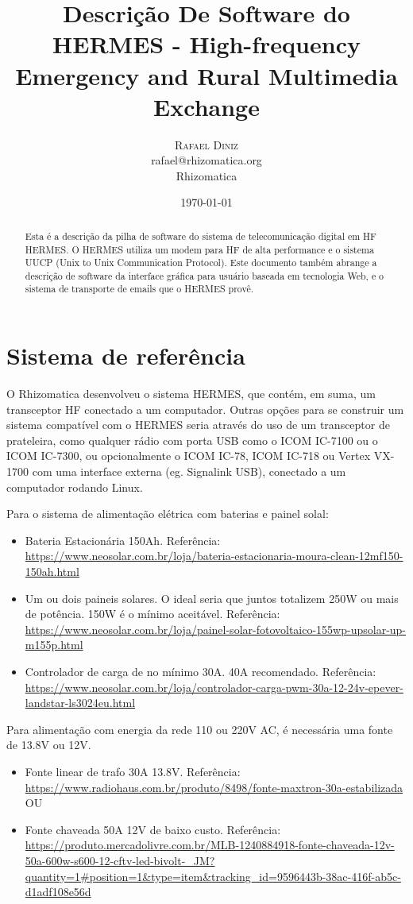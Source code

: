 \documentclass[11pt,a4paper]{article}
\title{Descrição De Software do HERMES - High-frequency Emergency and Rural Multimedia Exchange}
\author{
       \large
        \textsc{Rafael Diniz}
        \mbox{}\\ %
        rafael@rhizomatica.org\\
        \mbox{Rhizomatica} \\ %
}
\date{\today}
\begin{document}
\maketitle

\begin{abstract}
Esta é a descrição da pilha de software do sistema de telecomunicação digital em HF HERMES. O HERMES
utiliza um modem para HF de alta performance e o sistema UUCP (Unix to Unix
Communication Protocol). Este documento também abrange a descrição de
software da interface gráfica para usuário baseada em tecnologia Web, e o sistema de transporte de emails
que o HERMES provê.

\end{abstract}

\newpage

\tableofcontents

\section{Sistema de referência}

O Rhizomatica desenvolveu o sistema HERMES, que contém, em suma, um transceptor HF conectado a um computador.
Outras opções para se construir um sistema compatível com o HERMES seria através do uso de um transceptor de prateleira, como qualquer rádio com porta USB como o ICOM IC-7100 ou o ICOM IC-7300, ou opcionalmente o ICOM IC-78, ICOM IC-718 ou Vertex
VX-1700 com uma interface externa (eg. Signalink USB), conectado a um computador rodando Linux.

Para o sistema de alimentação elétrica com baterias e painel solal:
\begin{itemize}
\item Bateria Estacionária 150Ah. Referência: \url{https://www.neosolar.com.br/loja/bateria-estacionaria-moura-clean-12mf150-150ah.html}
\item Um ou dois paineis solares. O ideal seria que juntos totalizem 250W ou mais de potência. 150W é o mínimo aceitável. Referência: \url{https://www.neosolar.com.br/loja/painel-solar-fotovoltaico-155wp-upsolar-up-m155p.html}
\item Controlador de carga de no mínimo 30A. 40A recomendado. Referência: \url{https://www.neosolar.com.br/loja/controlador-carga-pwm-30a-12-24v-epever-landstar-ls3024eu.html}
\end{itemize}

Para alimentação com energia da rede 110 ou 220V AC, é necessária uma fonte de 13.8V ou 12V.
\begin{itemize}
\item Fonte linear de trafo 30A 13.8V. Referência: \url{https://www.radiohaus.com.br/produto/8498/fonte-maxtron-30a-estabilizada} OU
\item Fonte chaveada 50A 12V de baixo custo. Referência:
  \url{https://produto.mercadolivre.com.br/MLB-1240884918-fonte-chaveada-12v-50a-600w-s600-12-cftv-led-bivolt-_JM?quantity=1#position=1&type=item&tracking_id=9596443b-38ac-416f-ab5c-d1adf108e56d}
\end{itemize}
\end{document}
